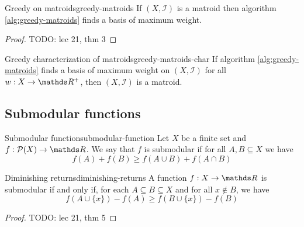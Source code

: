 \documentclass[12pt]{extarticle}
\begin{document}
\begin{theorem}{Greedy on matroids}{greedy-matroids}
	If $(X, \mathcal I)$ is a matroid then algorithm \ref{alg:greedy-matroids} finds a basis of
	maximum weight.
\end{theorem}

\begin{proof}
	TODO: lec 21, thm 3
\end{proof}

\begin{proposition}{Greedy characterization of matroids}{greedy-matroids-char}
	If algorithm \ref{alg:greedy-matroids} finds a basis of maximum weight on $(X, \mathcal I)$
	for all $w: X \to \R^+$, then $(X, \mathcal I)$ is a matroid.
\end{proposition}

\subsection{Submodular functions}
\begin{definition}{Submodular function}{submodular-function}
	Let $X$ be a finite set and $f: \mathcal P(X) \to \R$.
	We say that $f$ is submodular if for all $A, B \subseteq X$ we have
	\begin{equation}
		f(A) + f(B) \geq f(A \cup B) + f(A \cap B)
	\end{equation}
\end{definition}

\begin{proposition}{Diminishing returns}{diminishing-returns}
	A function $f: X \to \R$ is submodular if and only if, for each $A \subseteq B \subseteq X$ and
	for all $x \notin B$, we have
	\begin{equation}
		f(A \cup \{x\}) - f(A) \geq f(B \cup \{ x\}) - f(B)
	\end{equation}
\end{proposition}

\begin{proof}
	TODO: lec 21, thm 5
\end{proof}
\end{document}

